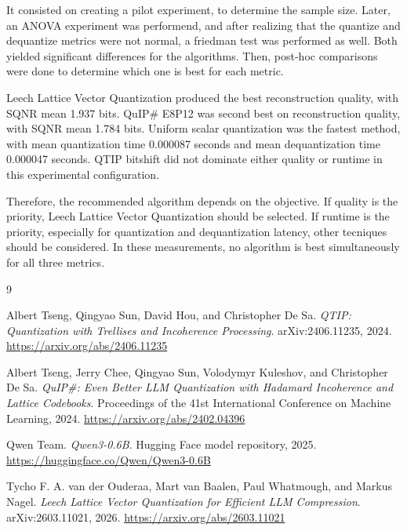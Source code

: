 \documentclass[11pt]{article}
\begin{document}
It consisted on creating a pilot experiment, to determine the sample size. Later, an ANOVA experiment was performend, and after realizing that
the quantize and dequantize metrics were not normal, a friedman test was performed as well. Both yielded significant differences for the algorithms.
Then, post-hoc comparisons were done to determine which one is best for each metric.

Leech Lattice Vector Quantization produced the best reconstruction quality, with SQNR mean 1.937 bits. QuIP\# E8P12 was second best on reconstruction quality, with SQNR mean 1.784 bits.
Uniform scalar quantization was the fastest method, with mean quantization time 0.000087 seconds and mean dequantization time 0.000047 seconds.
QTIP bitshift did not dominate either quality or runtime in this experimental configuration.

Therefore, the recommended algorithm depends on the objective. If quality is the priority, Leech Lattice Vector Quantization should be selected.
If runtime is the priority, especially for quantization and dequantization latency, other tecniques should be considered.
In these measurements, no algorithm is best simultaneously for all three metrics.

\begin{thebibliography}{9}

Albert Tseng, Qingyao Sun, David Hou, and Christopher De Sa.
\textit{QTIP: Quantization with Trellises and Incoherence Processing}.
arXiv:2406.11235, 2024.
\url{https://arxiv.org/abs/2406.11235}

Albert Tseng, Jerry Chee, Qingyao Sun, Volodymyr Kuleshov, and Christopher De Sa.
\textit{QuIP\#: Even Better LLM Quantization with Hadamard Incoherence and Lattice Codebooks}.
Proceedings of the 41st International Conference on Machine Learning, 2024.
\url{https://arxiv.org/abs/2402.04396}

Qwen Team.
\textit{Qwen3-0.6B}.
Hugging Face model repository, 2025.
\url{https://huggingface.co/Qwen/Qwen3-0.6B}

Tycho F. A. van der Ouderaa, Mart van Baalen, Paul Whatmough, and Markus Nagel.
\textit{Leech Lattice Vector Quantization for Efficient LLM Compression}.
arXiv:2603.11021, 2026.
\url{https://arxiv.org/abs/2603.11021}

\end{thebibliography}
\end{document}

